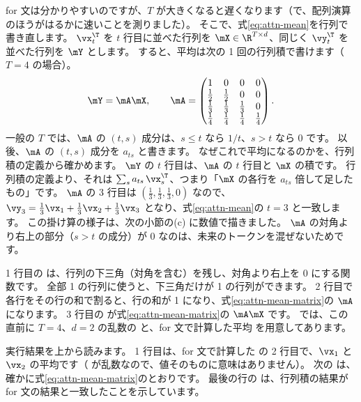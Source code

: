for 文は分かりやすいのですが、$T$ が大きくなると遅くなります（で、配列演算のほうがはるかに速いことを測りました）。
そこで、式\eqref{eq:attn-mean}を行列で書き直します。
$\vx_t^\T$ を $t$ 行目に並べた行列を $\mX \in \R^{T\times d}$、同じく $\vy_t^\T$ を並べた行列を $\mY$ とします。
すると、平均は次の 1 回の行列積で書けます（$T=4$ の場合）。
\begin{equation}
\mY = \mA\mX, \qquad
\mA = \begin{pmatrix}
1 & 0 & 0 & 0\\
\tfrac12 & \tfrac12 & 0 & 0\\
\tfrac13 & \tfrac13 & \tfrac13 & 0\\
\tfrac14 & \tfrac14 & \tfrac14 & \tfrac14
\end{pmatrix}.
\label{eq:attn-mean-matrix}
\end{equation}
一般の $T$ では、$\mA$ の $(t,s)$ 成分は、$s\le t$ なら $1/t$、$s>t$ なら 0 です。
以後、$\mA$ の $(t,s)$ 成分を $a_{ts}$ と書きます。
なぜこれで平均になるのかを、行列積の定義から確かめます。
$\mY$ の $t$ 行目は、$\mA$ の $t$ 行目と $\mX$ の積です。
行列積の定義より、それは $\sum_s a_{ts}\,\vx_s^\T$、つまり「$\mX$ の各行を $a_{ts}$ 倍して足したもの」です。
$\mA$ の 3 行目は $(\frac13,\frac13,\frac13,0)$ なので、$\vy_3 = \frac13\vx_1+\frac13\vx_2+\frac13\vx_3$ となり、式\eqref{eq:attn-mean}の $t=3$ と一致します。
この掛け算の様子は、次の小節の(c) に数値で描きました。
$\mA$ の対角より右上の部分（$s>t$ の成分）が 0 なのは、未来のトークンを混ぜないためです。


1 行目の  は、行列の下三角（対角を含む）を残し、対角より右上を 0 にする関数です。
全部 1 の行列に使うと、下三角だけが 1 の行列ができます。
2 行目で各行をその行の和で割ると、行の和が 1 になり、式\eqref{eq:attn-mean-matrix}の $\mA$ になります。
3 行目の  が式\eqref{eq:attn-mean-matrix}の $\mA\mX$ です。
 では、この直前に $T=4$、$d=2$ の乱数の  と、for 文で計算した平均  を用意してあります。


実行結果を上から読みます。
1 行目は、for 文で計算した  の 2 行目で、$\vx_1$ と $\vx_2$ の平均です（ が乱数なので、値そのものに意味はありません）。
次の  は、確かに式\eqref{eq:attn-mean-matrix}のとおりです。
最後の行の  は、行列積の結果が for 文の結果と一致したことを示しています。

